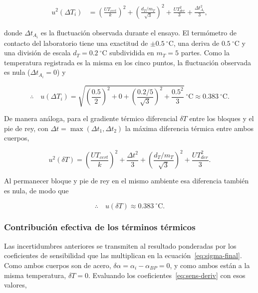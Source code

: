 \begin{align}
    u^2(\Delta T_i) &= \left(\frac{UT_{cert}}{k}\right)^2
    + \left(\frac{d_T / m_T}{\sqrt{3}}\right)^2
    + \frac{UT_{der}^2}{3}
    + \frac{\Delta t_{A_i}^2}{3},
    \label{eq:sigma-deltaTi}
\end{align}

donde $\Delta t_{A_i}$ es la fluctuación observada durante el ensayo. El termómetro de
contacto del laboratorio tiene una exactitud de $\pm 0.5\ ^\circ\text{C}$, una deriva
de $0.5\ ^\circ\text{C}$ y una división de escala $d_T = 0.2\ ^\circ\text{C}$
subdividida en $m_T = 5$ partes. Como la temperatura registrada es la misma en los
cinco puntos, la fluctuación observada es nula ($\Delta t_{A_i} = 0$) y

\begin{equation}
    \therefore\quad u(\Delta T_i) = \sqrt{\left(\frac{0.5}{2}\right)^2 + 0
    + \left(\frac{0.2/5}{\sqrt{3}}\right)^2 + \frac{0.5^2}{3}}\ ^\circ\text{C}
    \approx 0.383\ ^\circ\text{C}.
    \label{eq:sigma-deltaTi-valor}
\end{equation}

De manera análoga, para el gradiente térmico diferencial $\delta T$ entre los bloques
y el pie de rey, con $\Delta t = \max(\Delta t_1, \Delta t_2)$ la máxima diferencia
térmica entre ambos cuerpos,

\begin{equation}
    u^2(\delta T) = \left(\frac{UT_{cert}}{k}\right)^2 + \frac{\Delta t^2}{3}
    + \left(\frac{d_T / m_T}{\sqrt{3}}\right)^2 + \frac{UT_{der}^2}{3} .
    \label{eq:sigma-deltaT}
\end{equation}

Al permanecer bloque y pie de rey en el mismo ambiente esa diferencia también es
nula, de modo que

\begin{equation}
    \therefore\quad u(\delta T) \approx 0.383\ ^\circ\text{C}.
    \label{eq:sigma-deltaT-valor}
\end{equation}

\subsubsection*{Contribución efectiva de los términos térmicos}

Las incertidumbres anteriores se transmiten al resultado ponderadas por los
coeficientes de sensibilidad que las multiplican en la
ecuación~\eqref{eq:sigma-final}. Como ambos cuerpos son de acero,
$\delta\alpha = \alpha_i - \alpha_{BP} = 0$, y como ambos están a la misma
temperatura, $\delta T = 0$. Evaluando los coeficientes~\eqref{eq:sens-deriv} con
esos valores,

